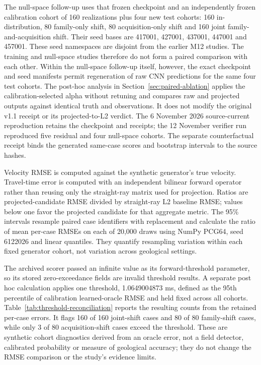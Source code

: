 \documentclass[11pt]{article}
\begin{document}
The null-space follow-up uses that frozen checkpoint and an independently frozen calibration cohort of 160 realizations plus four new test cohorts: 160 in-distribution, 80 family-only shift, 80 acquisition-only shift and 160 joint family-and-acquisition shift. Their seed bases are 417001, 427001, 437001, 447001 and 457001. These seed namespaces are disjoint from the earlier M12 studies. The training and null-space studies therefore do not form a paired comparison with each other. Within the null-space follow-up itself, however, the exact checkpoint and seed manifests permit regeneration of raw CNN predictions for the same four test cohorts. The post-hoc analysis in Section~\ref{sec:paired-ablation} applies the calibration-selected alpha without retuning and compares raw and projected outputs against identical truth and observations. It does not modify the original v1.1 receipt or its projected-to-L2 verdict. The 6 November 2026 source-current reproduction retains the checkpoint and receipts; the 12 November verifier run reproduced five residual and four null-space cohorts. The separate counterfactual receipt binds the generated same-case scores and bootstrap intervals to the source hashes.

Velocity RMSE is computed against the synthetic generator's true velocity. Travel-time error is computed with an independent bilinear forward operator rather than reusing only the straight-ray matrix used for projection. Ratios are projected-candidate RMSE divided by straight-ray L2 baseline RMSE; values below one favor the projected candidate for that aggregate metric. The 95\% intervals resample paired case identifiers with replacement and calculate the ratio of mean per-case RMSEs on each of 20,000 draws using NumPy PCG64, seed 6122026 and linear quantiles. They quantify resampling variation within each fixed generator cohort, not variation across geological settings.

The archived scorer passed an infinite value as its forward-threshold parameter, so its stored zero-exceedance fields are invalid threshold results. A separate post hoc calculation applies one threshold, 1.0649004873 ms, defined as the 95th percentile of calibration learned-oracle RMSE and held fixed across all cohorts. Table~\ref{tab:threshold-reconciliation} reports the resulting counts from the retained per-case errors. It flags 160 of 160 joint-shift cases and 80 of 80 family-shift cases, while only 3 of 80 acquisition-shift cases exceed the threshold. These are synthetic cohort diagnostics derived from an oracle error, not a field detector, calibrated probability or measure of geological accuracy; they do not change the RMSE comparison or the study's evidence limits.
\end{document}

